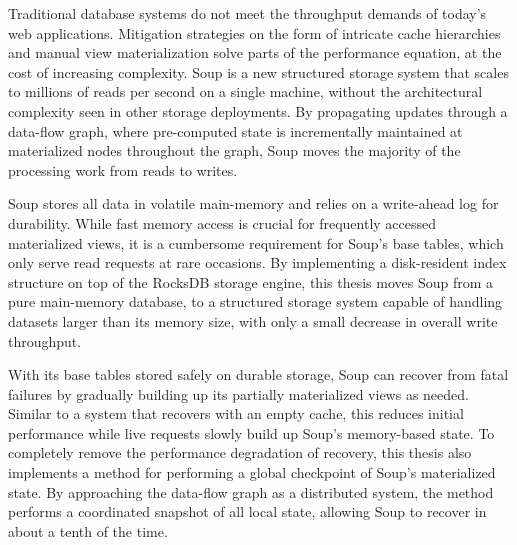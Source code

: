 Traditional database systems do not meet the throughput demands of today's web
applications. Mitigation strategies on the form of intricate cache hierarchies
and manual view materialization solve parts of the performance equation, at the
cost of increasing complexity. Soup is a new structured storage system that
scales to millions of reads per second on a single machine, without the
architectural complexity seen in other storage deployments. By propagating
updates through a data-flow graph, where pre-computed state is incrementally
maintained at materialized nodes throughout the graph, Soup moves the majority
of the processing work from reads to writes.

Soup stores all data in volatile main-memory and relies on a write-ahead log for
durability. While fast memory access is crucial for frequently accessed
materialized views, it is a cumbersome requirement for Soup's base tables, which
only serve read requests at rare occasions. By implementing a disk-resident
index structure on top of the RocksDB storage engine, this thesis moves Soup
from a pure main-memory database, to a structured storage system capable of
handling datasets larger than its memory size, with only a small decrease in
overall write throughput.

With its base tables stored safely on durable storage, Soup can recover from
fatal failures by gradually building up its partially materialized views as
needed. Similar to a system that recovers with an empty cache, this reduces
initial performance while live requests slowly build up Soup's memory-based
state. To completely remove the performance degradation of recovery, this thesis
also implements a method for performing a global checkpoint of Soup's
materialized state. By approaching the data-flow graph as a distributed system,
the method performs a coordinated snapshot of all local state, allowing Soup to
recover in about a tenth of the time.
